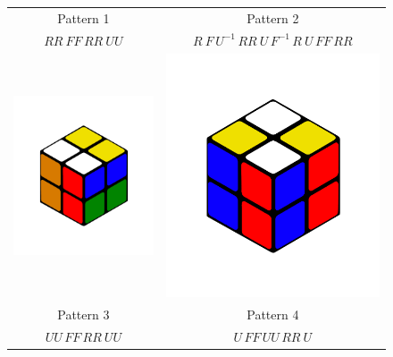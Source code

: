 \documentclass[12pt,a4paper]{article}
\theoremstyle{custom}
\begin{document}
\begin{figure}[H]
\begin{tabular}{cc}
Pattern 1 & Pattern 2 \\
$RR \ FF \, RR \ UU$ & $R \ F \, U^{-1} \, RR \ U \, F^{-1} \, R \ U \, FF \, RR$ \\
\includegraphics[scale=0.15]{UUFFRRUU.png} & \includegraphics[scale=0.15]{UFFUURRU.png} \\
Pattern 3 & Pattern 4 \\
$UU \, FF \, RR \ UU$ & $U \, FF \, UU \, RR \ U$ \\
\end{tabular}


\end{figure}
\end{document}
